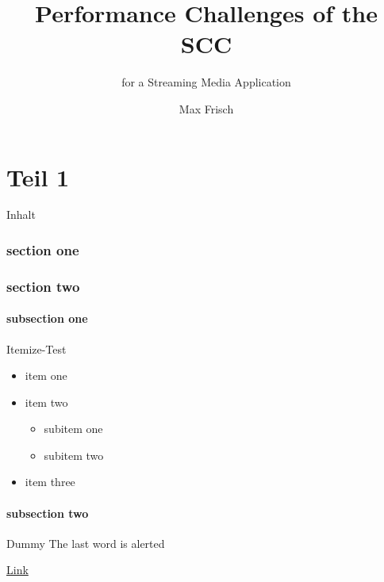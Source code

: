 \documentclass{beamer}
\title{Performance Challenges of the SCC}
\subtitle{for a Streaming Media Application}
\author{Max Frisch}
\begin{document}
\begin{frame}[plain]
  \titlepage
\end{frame}


\part{Teil 1}

\begin{frame}
  \partpage
\end{frame}


\begin{frame}{Inhalt}
  \tableofcontents
\end{frame}

\section{section one}

\section{section two}

\subsection{subsection one}

\begin{frame}{Itemize-Test}
  \begin{itemize}
    \item item one
    \item item two
    \begin{itemize}
      \item subitem one
      \item subitem two
    \end{itemize}
    \item item three
  \end{itemize}
\end{frame}

\subsection{subsection two}

\begin{frame}[highlight]{Dummy}
  The last word is \alert{alerted}\par
  \url{Link}
\end{frame}
\end{document}
